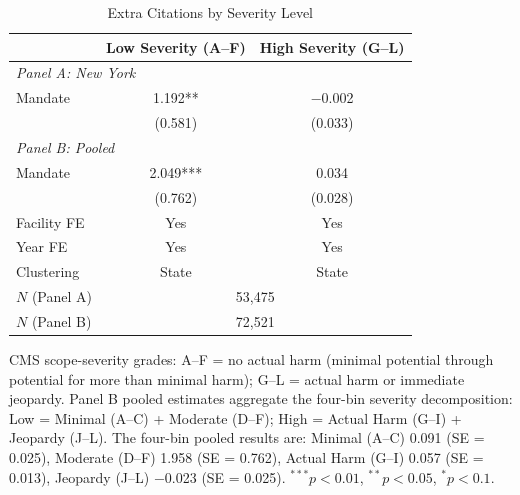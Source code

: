 \begin{table}[htbp]
\centering
\caption{Extra Citations by Severity Level}
\label{tab:severity}
\begin{tabular}{lcc}
\toprule
 & Low Severity (A--F) & High Severity (G--L) \\
\midrule
\multicolumn{3}{l}{\textit{Panel A: New York}} \\[0.3em]
Mandate & 1.192** & $-$0.002 \\
 & (0.581) & (0.033) \\[0.5em]
\multicolumn{3}{l}{\textit{Panel B: Pooled}} \\[0.3em]
Mandate & 2.049*** & 0.034 \\
 & (0.762) & (0.028) \\
\midrule
Facility FE & Yes & Yes \\
Year FE & Yes & Yes \\
Clustering & State & State \\
$N$ (Panel A) & \multicolumn{2}{c}{53,475} \\
$N$ (Panel B) & \multicolumn{2}{c}{72,521} \\
\bottomrule
\end{tabular}
\begin{flushleft}\small
CMS scope-severity grades: A--F = no actual harm (minimal potential through potential for more than minimal harm); G--L = actual harm or immediate jeopardy. Panel B pooled estimates aggregate the four-bin severity decomposition: Low = Minimal (A--C) + Moderate (D--F); High = Actual Harm (G--I) + Jeopardy (J--L). The four-bin pooled results are: Minimal (A--C) 0.091 (SE = 0.025), Moderate (D--F) 1.958 (SE = 0.762), Actual Harm (G--I) 0.057 (SE = 0.013), Jeopardy (J--L) $-$0.023 (SE = 0.025). $^{***}p<0.01$, $^{**}p<0.05$, $^{*}p<0.1$.
\end{flushleft}
\end{table}

